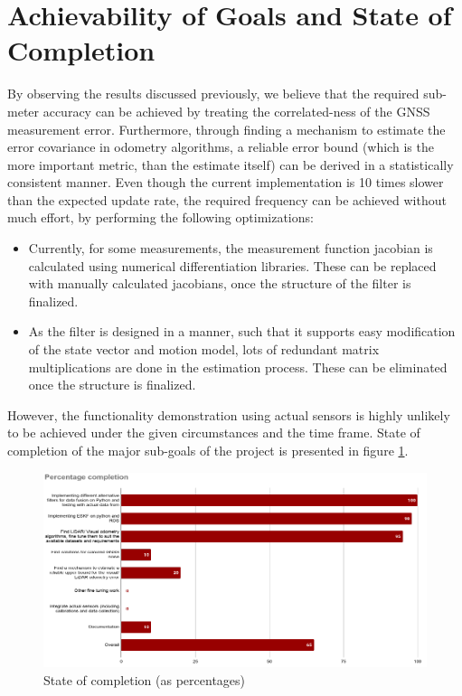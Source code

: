 \section{Achievability of Goals and State of Completion}
By observing the results discussed previously, we believe that the required sub-meter accuracy can be achieved by treating the correlated-ness of the \gls{GNSS} measurement error. Furthermore, through finding a mechanism to estimate the error covariance in odometry algorithms, a reliable error bound (which is the more important metric, than the estimate itself) can be derived in a statistically consistent manner. Even though the current implementation is 10 times slower than the expected update rate, the required frequency can be achieved without much effort, by performing the following optimizations:
\begin{itemize}
    \item Currently, for some measurements, the measurement function jacobian is calculated using numerical differentiation libraries. These can be replaced with manually calculated jacobians, once the structure of the filter is finalized.
    \item As the filter is designed in a manner, such that it supports easy modification of the state vector and motion model, lots of redundant matrix multiplications are done in the estimation process. These can be eliminated once the structure is finalized.
\end{itemize}
However, the functionality demonstration using actual sensors is highly unlikely to be achieved under the given circumstances and the time frame. State of completion of the major sub-goals of the project is presented in figure \ref{fig:pa:completionState}.
\begin{figure}[t]
	\centering
	\includegraphics[width=\textwidth]{figs/completion_state.png}
	\vspace{-0.5cm}
	\caption{State of completion (as percentages)}
	\label{fig:pa:completionState}
	\vspace{0.5cm}
\end{figure}
